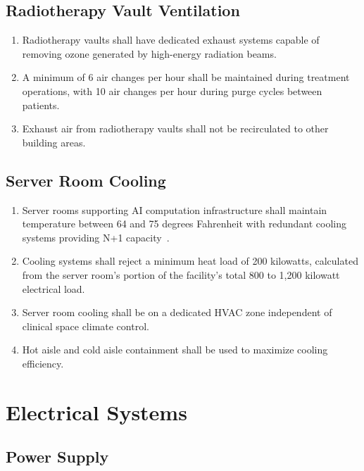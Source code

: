 \documentclass[11pt,letterpaper]{article}
\begin{document}
\subsection{Radiotherapy Vault Ventilation}

\begin{enumerate}[label=(\alph*)]
\item Radiotherapy vaults shall have dedicated exhaust systems capable of
  removing ozone generated by high-energy radiation beams.

\item A minimum of 6 air changes per hour shall be maintained during treatment
  operations, with 10 air changes per hour during purge cycles between patients.

\item Exhaust air from radiotherapy vaults shall not be recirculated to other
  building areas.
\end{enumerate}

\subsection{Server Room Cooling}

\begin{enumerate}[label=(\alph*)]
\item Server rooms supporting AI computation infrastructure shall maintain
  temperature between 64 and 75 degrees Fahrenheit with redundant cooling
  systems providing N+1 capacity~\cite{sitespec2026}.

\item Cooling systems shall reject a minimum heat load of 200 kilowatts,
  calculated from the server room's portion of the facility's total 800 to
  1,200 kilowatt electrical load.

\item Server room cooling shall be on a dedicated HVAC zone independent of
  clinical space climate control.

\item Hot aisle and cold aisle containment shall be used to maximize cooling
  efficiency.
\end{enumerate}

\section{Electrical Systems}

\subsection{Power Supply}
\end{document}
